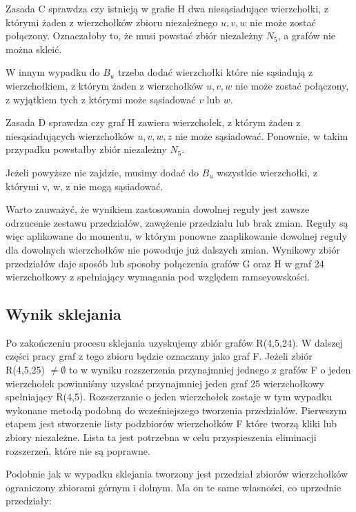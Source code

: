 \documentclass[11pt]{article}
\begin{document}
Zasada C sprawdza czy istnieją w grafie H dwa niesąsiadujące wierzchołki, z którymi żaden z wierzchołków zbioru niezależnego $u, v, w$ nie może zostać połączony. 
Oznaczałoby to, że musi powstać zbiór niezależny $N_5$, a grafów nie można skleić.


W innym wypadku do $B_u$ trzeba dodać wierzchołki które nie sąsiadują z wierzchołkiem, 
z którym żaden z wierzchołków $u, v, w$ nie może zostać połączony, z wyjątkiem tych z którymi może sąsiadować $v$ lub $w$.  \par

Zasada D sprawdza czy graf H zawiera wierzchołek, z którym żaden z niesąsiadujących wierzchołków $u, v, w, z$
nie może sąsiadować. Ponownie, w takim przypadku powstałby zbiór niezależny $N_5$.

Jeżeli powyższe nie zajdzie, musimy dodać do $B_u$ wszystkie wierzchołki, z którymi v, w, z nie mogą sąsiadować. \par


Warto zauważyć, że wynikiem zastosowania dowolnej reguły jest zawsze odrzucenie zestawu przedziałów, zawężenie przedziału lub brak zmian. Reguły są więc aplikowane do momentu, w którym ponowne zaaplikowanie dowolnej reguły dla dowolnych wierzchołków nie powoduje już dalszych zmian. Wynikowy zbiór przedziałów daje sposób lub sposoby połączenia grafów G oraz H w graf 24 wierzchołkowy z spełniający wymagania pod względem ramseyowskości.

\subsection{Wynik sklejania}

Po zakończeniu procesu sklejania uzyskujemy zbiór grafów R(4,5,24). W dalszej części pracy graf z tego zbioru będzie oznaczany jako graf F. Jeżeli zbiór R(4,5,25) $\neq \emptyset$ to w wyniku rozszerzenia przynajmniej jednego z grafów F o jeden wierzchołek powinniśmy uzyskać przynajmniej jeden graf 25 wierzchołkowy spełniający R(4,5). 
Rozszerzanie o jeden wierzchołek zostaje w tym wypadku wykonane metodą podobną do wcześniejszego tworzenia przedziałów. Pierwszym etapem jest stworzenie listy podzbiorów wierzchołków F które tworzą kliki lub zbiory niezależne. Lista ta jest potrzebna w celu przyspieszenia eliminacji rozszerzeń, które nie są poprawne.

Podobnie jak w wypadku sklejania tworzony jest przedział zbiorów wierzchołków ograniczony zbiorami górnym i dolnym. Ma on te same własności, co uprzednie przedziały:
\end{document}
